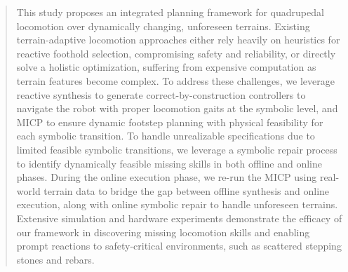 \documentclass[letterpaper, 10 pt, conference]{ieeeconf}
\begin{document}
\begin{abstract}

This study proposes an integrated planning framework for quadrupedal locomotion over dynamically changing, unforeseen terrains.
Existing terrain-adaptive locomotion approaches either rely heavily on heuristics for reactive foothold selection, compromising safety and reliability, or directly solve a holistic optimization, suffering from expensive computation as terrain features become complex.
To address these challenges,
we leverage reactive synthesis to 
generate correct-by-construction controllers
to navigate the robot with proper locomotion gaits at the symbolic level, 
and MICP to ensure dynamic footstep planning with physical feasibility for each symbolic transition.
To handle unrealizable specifications due to limited feasible symbolic transitions, we leverage a 
symbolic repair process to identify dynamically feasible missing skills in both offline and online phases. %
During the online execution phase, we re-run the MICP using real-world terrain data to bridge the gap between offline synthesis and online execution, along with online symbolic repair to handle unforeseen terrains.
Extensive simulation and hardware experiments demonstrate the efficacy of our framework in discovering missing locomotion skills and enabling prompt reactions to safety-critical environments, such as scattered stepping stones and rebars.
\end{abstract}
\end{document}
